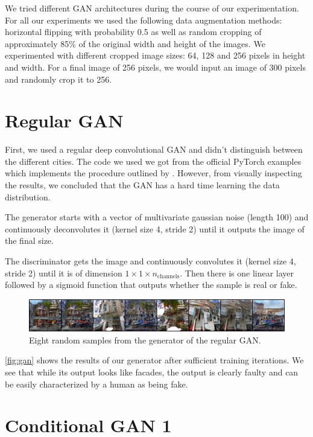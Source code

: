 \documentclass[a4paper]{article}
\begin{document}
We tried different GAN architectures during the course of our experimentation. For all our experiments we used the following data augmentation methods: horizontal flipping with probability 0.5 as well as random cropping of approximately 85\% of the original width and height of the images. We experimented with different cropped image sizes: 64, 128 and 256 pixels in height and width. For a final image of 256 pixels, we would input an image of 300 pixels and randomly crop it to 256.

\section{Regular GAN}

First, we used a regular deep convolutional GAN \citep{radford_unsupervised_2015} and didn't distinguish between the different cities. The code we used we got from the official PyTorch examples \citep{pytorch_deep_2019} which implements the procedure outlined by \citet{radford_unsupervised_2015}. However, from visually inspecting the results, we concluded that the GAN has a hard time learning the data distribution. 

The generator starts with a vector of multivariate gaussian noise (length 100) and continuously deconvolutes it (kernel size 4, stride 2) until it outputs the image of the final size. 

The discriminator gets the image and continuously convolutes it (kernel size 4, stride 2) until it is of dimension $1\times 1 \times n_\text{channels}$. Then there is one linear layer followed by a sigmoid function that outputs whether the sample is real or fake. 

\begin{figure}[h]
\includegraphics[width=\columnwidth]{figures/gan.png}
\caption{Eight random samples from the generator of the regular GAN.}
\label{fig:gan}
\end{figure}

\autoref{fig:gan} shows the results of our generator after sufficient training iterations. We see that while its output looks like facades, the output is clearly faulty and can be easily characterized by a human as being fake. 

\section{Conditional GAN 1}
\end{document}
